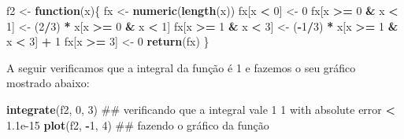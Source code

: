 \documentclass[10pt,a4paper]{book}
\newenvironment{Shaded}{\begin{snugshade}}{\end{snugshade}}
\newcommand{\KeywordTok}[1]{\textcolor[rgb]{0.13,0.29,0.53}{\textbf{#1}}}
\newcommand{\DecValTok}[1]{\textcolor[rgb]{0.00,0.00,0.81}{#1}}
\newcommand{\FloatTok}[1]{\textcolor[rgb]{0.00,0.00,0.81}{#1}}
\newcommand{\StringTok}[1]{\textcolor[rgb]{0.31,0.60,0.02}{#1}}
\newcommand{\ControlFlowTok}[1]{\textcolor[rgb]{0.13,0.29,0.53}{\textbf{#1}}}
\newcommand{\OperatorTok}[1]{\textcolor[rgb]{0.81,0.36,0.00}{\textbf{#1}}}
\newcommand{\NormalTok}[1]{#1}
\begin{document}
\begin{Shaded}
\begin{Highlighting}[]
\NormalTok{f2 <-}\StringTok{ }\ControlFlowTok{function}\NormalTok{(x)\{}
\NormalTok{  fx <-}\StringTok{ }\KeywordTok{numeric}\NormalTok{(}\KeywordTok{length}\NormalTok{(x))}
\NormalTok{  fx[x }\OperatorTok{<}\StringTok{ }\DecValTok{0}\NormalTok{] <-}\StringTok{ }\DecValTok{0}
\NormalTok{  fx[x }\OperatorTok{>=}\StringTok{ }\DecValTok{0} \OperatorTok{&}\StringTok{ }\NormalTok{x }\OperatorTok{<}\StringTok{ }\DecValTok{1}\NormalTok{] <-}\StringTok{ }\NormalTok{(}\DecValTok{2}\OperatorTok{/}\DecValTok{3}\NormalTok{) }\OperatorTok{*}\StringTok{ }\NormalTok{x[x }\OperatorTok{>=}\StringTok{ }\DecValTok{0} \OperatorTok{&}\StringTok{ }\NormalTok{x }\OperatorTok{<}\StringTok{ }\DecValTok{1}\NormalTok{]}
\NormalTok{  fx[x }\OperatorTok{>=}\StringTok{ }\DecValTok{1} \OperatorTok{&}\StringTok{ }\NormalTok{x }\OperatorTok{<}\StringTok{ }\DecValTok{3}\NormalTok{] <-}\StringTok{ }\NormalTok{(}\OperatorTok{-}\DecValTok{1}\OperatorTok{/}\DecValTok{3}\NormalTok{) }\OperatorTok{*}\StringTok{ }\NormalTok{x[x }\OperatorTok{>=}\StringTok{ }\DecValTok{1} \OperatorTok{&}\StringTok{ }\NormalTok{x }\OperatorTok{<}\StringTok{ }\DecValTok{3}\NormalTok{] }\OperatorTok{+}\StringTok{ }\DecValTok{1}
\NormalTok{  fx[x }\OperatorTok{>=}\StringTok{ }\DecValTok{3}\NormalTok{] <-}\StringTok{ }\DecValTok{0}
  \KeywordTok{return}\NormalTok{(fx)}
\NormalTok{\}}
\end{Highlighting}
\end{Shaded}

A seguir verificamos que a integral da função é 1 e fazemos o seu
gráfico mostrado abaixo:

\begin{Shaded}
\begin{Highlighting}[]
\KeywordTok{integrate}\NormalTok{(f2, }\DecValTok{0}\NormalTok{, }\DecValTok{3}\NormalTok{) ## verificando que a integral vale 1}
\DecValTok{1}\NormalTok{ with absolute error }\OperatorTok{<}\StringTok{ }\FloatTok{1.1e-15}
\KeywordTok{plot}\NormalTok{(f2, }\OperatorTok{-}\DecValTok{1}\NormalTok{, }\DecValTok{4}\NormalTok{)     ## fazendo o gráfico da função}
\end{Highlighting}
\end{Shaded}
\end{document}
